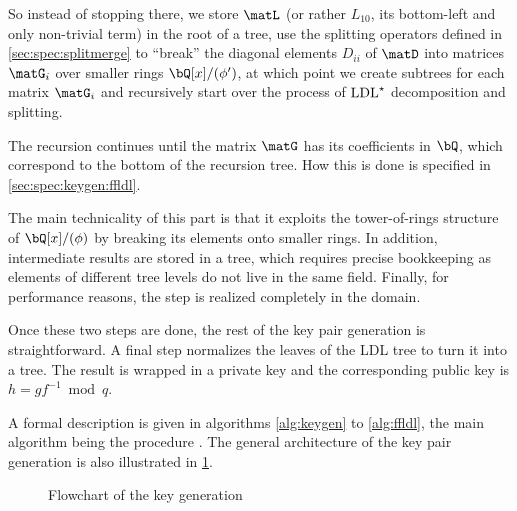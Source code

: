 \begin{itemize}
 So instead of stopping there, we store $\matL$ (or rather $L_{10}$, its bottom-left and only non-trivial term) in the root of a tree, use the splitting operators defined in \cref{sec:spec:splitmerge} to ``break'' the diagonal elements $D_{ii}$ of $\matD$ into matrices $\matG_i$ over smaller rings $\bQ[x]/(\phi')$, at which point we create subtrees for each matrix $\matG_i$ and recursively start over the process of $ \text{LDL}^\star $ decomposition and splitting.
 
 The recursion continues until the matrix $\matG$ has its coefficients in $\bQ$, which correspond to the bottom of the recursion tree. How this is done is specified in \cref{sec:spec:keygen:ffldl}.
 
 The main technicality of this part is that it exploits the tower-of-rings structure of $\bQ[x]/(\phi)$ by breaking its elements onto smaller rings. In addition, intermediate results are stored in a tree, which requires precise bookkeeping as elements of different tree levels do not live in the same field. Finally, for performance reasons, the step is realized completely in the \fft domain.
\end{itemize}

Once these two steps are done, the rest of the key pair generation is straightforward. A final step normalizes the leaves of the LDL tree to turn it into a \falcon tree. The result is wrapped in a private key \sk and the corresponding public key \pk is $h = g f^{-1} \bmod q$. 


A formal description is given in algorithms \ref{alg:keygen} to \ref{alg:ffldl}, the main algorithm being the procedure \longkeygen. The general architecture of the key pair generation is also illustrated in \cref{fig:keygen}.

\begin{figure}[t]
\centering
{}
\caption{Flowchart of the key generation}\label{fig:keygen}
\end{figure}



